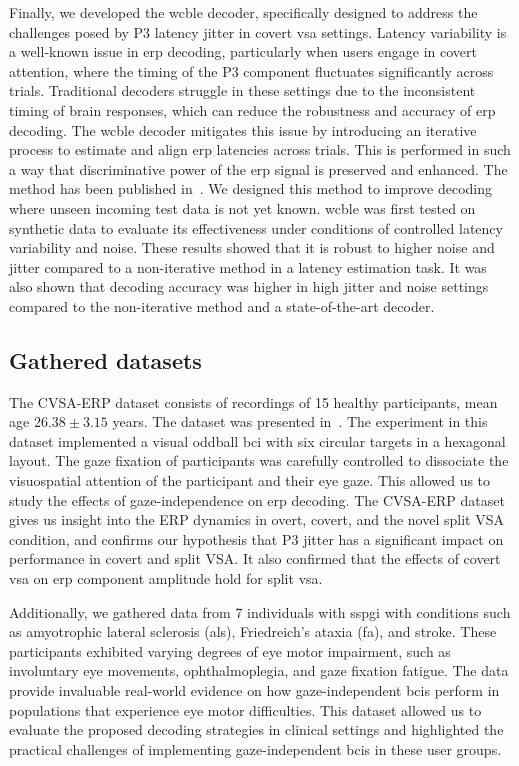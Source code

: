 Finally, we developed the \acf{wcble} decoder, specifically designed to address
the challenges posed by P3 latency jitter in covert \ac{vsa} settings.
Latency variability is a well-known issue in \ac{erp} decoding, particularly
when users engage in covert attention, where the timing of the P3 component
fluctuates significantly across trials.
Traditional decoders struggle in these settings due to the inconsistent timing
of brain responses, which can reduce the robustness and accuracy of
\ac{erp} decoding.
The \ac{wcble} decoder mitigates this issue by introducing an iterative process
to estimate and align \ac{erp} latencies across trials.
This is performed in such a way that discriminative power of the \ac{erp}
signal is preserved and enhanced.
The method has been published in~\textcite{VanDenKerchove2024}.
We designed this method to improve decoding where
unseen incoming test data is not yet known.
\Ac{wcble} was first tested on synthetic data to evaluate its
effectiveness under conditions of controlled latency variability and noise.
These results showed that it is robust to higher noise and jitter compared to
a non-iterative method in a latency estimation task.
It was also shown that decoding accuracy was higher in high jitter and noise
settings compared to the non-iterative method and a state-of-the-art decoder.

\subsection{Gathered datasets}
The CVSA-ERP dataset consists of recordings of 15 healthy participants, mean age
$26.38\pm3.15$ years.
The dataset was presented in~\textcite{VanDenKerchove2024}.
The experiment in this dataset implemented a visual oddball \ac{bci} with six
circular targets in a hexagonal layout.
The gaze fixation of participants was carefully controlled to dissociate the
visuospatial attention of the participant and their eye gaze.
This allowed us to study the effects of gaze-independence on \ac{erp} decoding.
The CVSA-ERP dataset gives us insight into the ERP dynamics in overt, covert, and the
novel split VSA condition, and confirms our hypothesis that P3 jitter has a
significant impact on performance in covert and split VSA.
It also confirmed that the effects of covert \ac{vsa} on \ac{erp} component
amplitude hold for split \ac{vsa}.

Additionally, we gathered data from 7 individuals with \ac{sspgi} with conditions such as
amyotrophic lateral sclerosis (\ac{als}), Friedreich's ataxia (\ac{fa}), and stroke.
These participants exhibited varying degrees of eye motor impairment, such as
involuntary eye movements, ophthalmoplegia, and gaze fixation fatigue.
The data provide invaluable real-world evidence on how gaze-independent
\acp{bci} perform in populations that experience eye motor difficulties.
This dataset allowed us to evaluate the proposed decoding strategies in clinical settings and
highlighted the practical challenges of implementing gaze-independent \acp{bci} in these user
groups.

